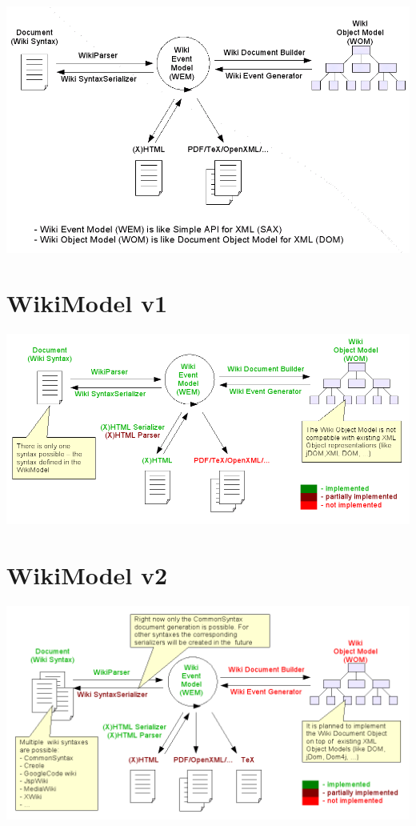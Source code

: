 \documentclass{article}
\begin{document}
\includegraphics[bb=0 0 300 183]{HowWikiModelWorks.png}


\section{WikiModel v1}

\includegraphics[bb=0 0 300 141]{WikiModel_v1.png}


\section{WikiModel v2}

\includegraphics[bb=0 0 300 159]{WikiModel_v2.png}
\end{document}
